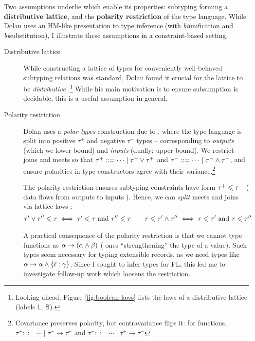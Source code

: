 Two assumptions underlie \mlsub{} which enable its properties: subtyping forming a \textbf{distributive lattice}, and the \textbf{polarity restriction} of the type language. While Dolan uses an HM-like presentation to type inference (with \emph{bi}unification and \emph{bi}substitution), I illustrate these assumptions in a constraint-based setting. \begin{description}
    \item[Distributive lattice] While constructing a lattice of types for conveniently well-behaved subtyping relations was standard, Dolan found it crucial for the lattice to be \emph{distributive} \cite[Section~3.2]{dolan-thesis}.\footnote{Looking ahead, Figure \ref{fig:boolean-laws} lists the laws of a distributive lattice (labels $\mathsf L$, $\mathsf B$).} While his main motivation is to ensure subsumption is decidable, this is a useful assumption in general.
    \item[Polarity restriction] Dolan \cite[Section~5.1]{dolan-thesis} uses a \emph{polar types} construction due to \textcite{pottier-thesis}, where the type language is split into positive $\tau^+$ and negative $\tau^-$ types -- corresponding to \emph{outputs} (which we lower-bound) and \emph{inputs} (dually: upper-bound). We restrict joins and meets so that $\tau^+ ::= \cdots \mid \tau^+ \lor \tau^+$ and $\tau^- ::= \cdots \mid \tau^- \land \tau^-$,
    and ensure polarities in type constructors agree with their variance.\footnote{Covariance preserves polarity, but contravariance flips it: for functions, $\tau^+ ::= \cdots \mid \tau^- \to \tau^+$ and $\tau^- ::= \cdots \mid \tau^+ \to \tau^-$}
    
    The polarity restriction ensures subtyping constraints have form $\tau^+ \leqslant \tau^-$ (\cf{} data flows from outputs to inputs \cite[Section~1.1]{dolan-thesis}). Hence, we can \emph{split} meets and joins via lattice laws \cite{simple-sub}: 
    \begin{align*}
        \tau' \lor \tau'' \leqslant \tau \iff \tau' \leqslant \tau \text{ and } \tau'' \leqslant \tau \qquad
        \tau \leqslant \tau' \land \tau'' \iff \tau \leqslant \tau' \text{ and } \tau \leqslant \tau''
    \end{align*}

    A practical consequence of the polarity restriction is that we cannot type functions as $\alpha \to (\alpha \land \beta)$ (\ie{} ones \enquote{strengthening} the type of a value). Such types seem necessary for typing extensible records, as we need types like $\alpha \to \alpha \meet \flrec{\ell : \gamma}$. Since I sought to infer types for FL, this led me to investigate follow-up work which loosens the restriction. 
\end{description}

